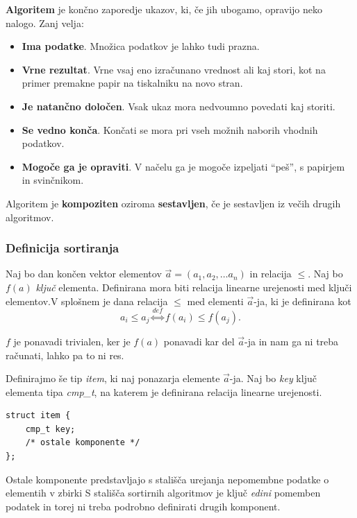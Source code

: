 \documentclass[a4paper,oneside]{article}
\begin{document}
\textbf{Algoritem} je končno zaporedje ukazov, ki, če jih ubogamo, opravijo neko nalogo.
Zanj velja:
\begin{itemize}
  \item \textbf{Ima podatke}. Množica podatkov je lahko tudi prazna.
  \item \textbf{Vrne rezultat}. Vrne vsaj eno izračunano vrednost ali kaj stori, kot na primer
    premakne papir na tiskalniku na novo stran.
  \item \textbf{Je natančno določen}. Vsak ukaz mora nedvoumno povedati kaj storiti.
  \item \textbf{Se vedno konča}. Končati se mora pri vseh možnih naborih vhodnih podatkov.
  \item \textbf{Mogoče ga je opraviti}. V načelu ga je mogoče izpeljati ``peš'', s papirjem in
    svinčnikom.
\end{itemize}


\begin{definicija}
  Algoritem je \textbf{kompoziten} oziroma \textbf{sestavljen}, če je sestavljen iz večih
  drugih algoritmov.
\end{definicija}


\subsubsection{Definicija sortiranja}
Naj bo dan končen vektor elementov $\vec{a} = \left(a_1, a_2, \ldots a_n \right)$ in relacija $\leq$.
Naj bo $f(a)$ \emph{ključ} elementa. Definirana mora biti relacija linearne urejenosti med 
ključi elementov.V splošnem je dana relacija $\leq$ med elementi $\vec{a}$-ja, ki je definirana kot 
\[a_i \leq a_j \overset{def}{\Longleftrightarrow} f(a_i) \leq f(a_j). \]

$f$ je ponavadi trivialen, ker je $f(a)$ ponavadi kar del $\vec{a}$-ja in nam ga ni treba
računati, lahko pa to ni res. 

Definirajmo še tip \emph{item}, ki naj ponazarja elemente $\vec{a}$-ja. Naj bo \emph{key}
ključ elementa tipa \emph{cmp\_t}, na katerem je definirana relacija linearne urejenosti.

\begin{lstlisting}
struct item {
    cmp_t key;
    /* ostale komponente */
};
\end{lstlisting}

Ostale komponente predstavljajo s stališča urejanja nepomembne podatke o elementih v zbirki
S stališča sortirnih algoritmov je ključ \emph{edini} pomemben podatek in torej ni treba
podrobno definirati drugih komponent.
\end{document}
